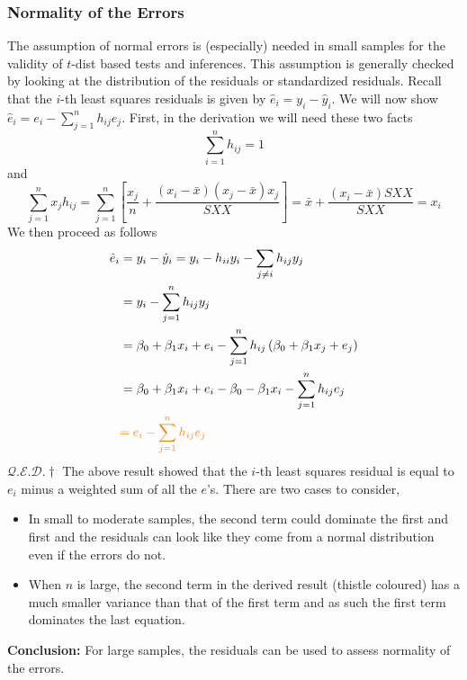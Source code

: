 \documentclass[11pt]{article}
\newcommand{\qed}{\hfill $\mathcal{Q}.\mathcal{E}.\mathcal{D}.\dagger$}
\begin{document}
\subsubsection{Normality of the Errors}
The assumption of normal errors is (especially) needed in small samples for the validity of $t$-dist based tests and inferences. This assumption is generally checked by looking at the distribution of the residuals or standardized residuals. Recall that the $i$-th least squares residuals is given by $\hat{e}_{i}=y_{i}-\hat{y}_{i}$. We will now show $\hat{e}_{i}=e_{i}-\sum_{j=1}^{n} h_{i j} e_{j}$. First, in the derivation we will need these two facts
\begin{equation*}
    \sum_{i=1}^{n} h_{i j}=1
\end{equation*}
and 
\begin{equation*}
    \sum_{j=1}^{n} x_{j} h_{i j}=\sum_{j=1}^{n}\left[\frac{x_{j}}{n}+\frac{\left(x_{i}-\bar{x}\right)\left(x_{j}-\bar{x}\right) x_{j}}{S X X}\right]=\bar{x}+\frac{\left(x_{i}-\bar{x}\right) S X X}{S X X}=x_{i}
\end{equation*}
We then proceed as follows
\begin{align*} 
    \hat{e}_{i} &=y_{i}-\hat{y}_{i} =y_{i}-h_{i i} y_{i}-\sum_{j \neq i} h_{i j} y_{j} \\ 
    &=y_{i}-\sum_{j=1}^{n} h_{i j} y_{j} \\ 
    &=\beta_{0}+\beta_{1} x_{i}+e_{i}-\sum_{j=1}^{n} h_{i j}\left(\beta_{0}+\beta_{1} x_{j}+e_{j}\right) \\ 
    &=\beta_{0}+\beta_{1} x_{i}+e_{i}-\beta_{0}-\beta_{1} x_{i}-\sum_{j=1}^{n} h_{i j} e_{j} \\ 
    &\color{BurntOrange}{=e_{i}-\sum_{j=1}^{n} h_{i j} e_{j}}
\end{align*}
\hfill \qed \newline
The above result showed that the $i$-th least squares residual is equal to $e_i$ minus a weighted sum of all the $e$'s. There are two cases to consider,
\begin{itemize}
    \item In small to moderate samples, the second term could dominate the first and first and the residuals can look like they come from a normal distribution even if the errors do not. 
    \item When $n$ is large, the second term in the derived result (thistle coloured) has a much smaller variance than that of the first term and as such the first term dominates the last equation. 
\end{itemize}
\textbf{Conclusion:} For large samples, the residuals can be used to assess normality of the errors.
\end{document}
